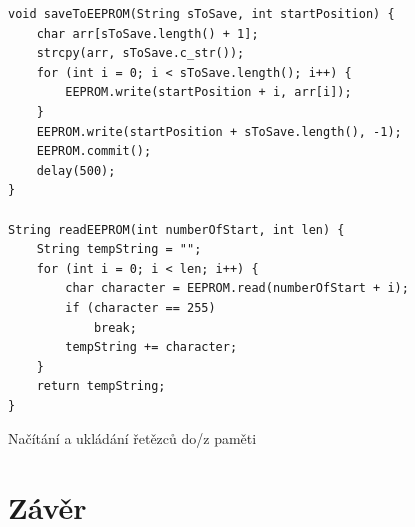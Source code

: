 \documentclass[a4paper, 12pt]{report}
\begin{document}
    \begin{listing}[]
    \begin{verbatim}
void saveToEEPROM(String sToSave, int startPosition) {
    char arr[sToSave.length() + 1];
    strcpy(arr, sToSave.c_str());
    for (int i = 0; i < sToSave.length(); i++) {
        EEPROM.write(startPosition + i, arr[i]);
    }
    EEPROM.write(startPosition + sToSave.length(), -1);
    EEPROM.commit();
    delay(500);
}

String readEEPROM(int numberOfStart, int len) {
    String tempString = "";
    for (int i = 0; i < len; i++) {
        char character = EEPROM.read(numberOfStart + i);
        if (character == 255)
            break;
        tempString += character;
    }
    return tempString;
}
    \end{verbatim}
    \label{listing:eeprom}
    \caption{Načítání a ukládání řetězců do/z paměti}
    \end{listing}



    \chapter{Závěr}
    \renewcommand\listoflistingscaption{Seznam úryvků kódu}
    \listoflistings
    \listoftables

    \listoffigures

    
    
\end{document}
